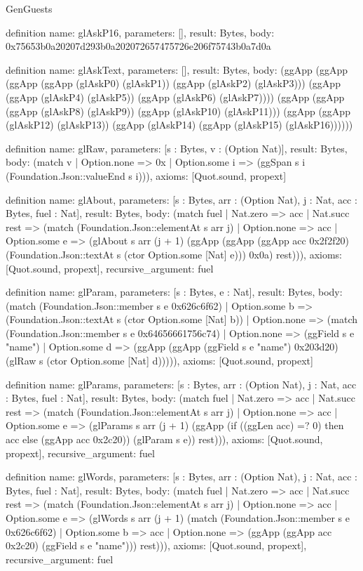 \begin{lexlean}{GenGuests}
\begin{semanticmodule}
definition{
  name: glAskP16,
  parameters: [],
  result: Bytes,
  body: 0x75653b0a20207d293b0a202072657475726e206f75743b0a7d0a
}

definition{
  name: glAskText,
  parameters: [],
  result: Bytes,
  body: (ggApp (ggApp (ggApp (ggApp (glAskP0) (glAskP1)) (ggApp (glAskP2) (glAskP3))) (ggApp (ggApp (glAskP4) (glAskP5)) (ggApp (glAskP6) (glAskP7)))) (ggApp (ggApp (ggApp (glAskP8) (glAskP9)) (ggApp (glAskP10) (glAskP11))) (ggApp (ggApp (glAskP12) (glAskP13)) (ggApp (glAskP14) (ggApp (glAskP15) (glAskP16))))))
}

definition{
  name: glRaw,
  parameters: [s : Bytes, v : (Option Nat)],
  result: Bytes,
  body: (match v
    | Option.none => 0x
    | Option.some i => (ggSpan s i (Foundation.Json::valueEnd s i))),
  axioms: [Quot.sound, propext]
}

definition{
  name: glAbout,
  parameters: [s : Bytes, arr : (Option Nat), j : Nat, acc : Bytes, fuel : Nat],
  result: Bytes,
  body: (match fuel
    | Nat.zero => acc
    | Nat.succ rest => (match (Foundation.Json::elementAt s arr j)
      | Option.none => acc
      | Option.some e => (glAbout s arr (j + 1) (ggApp (ggApp (ggApp acc 0x2f2f20) (Foundation.Json::textAt s (ctor Option.some [Nat] e))) 0x0a) rest))),
  axioms: [Quot.sound, propext],
  recursive_argument: fuel
}

definition{
  name: glParam,
  parameters: [s : Bytes, e : Nat],
  result: Bytes,
  body: (match (Foundation.Json::member s e 0x626c6f62)
    | Option.some b => (Foundation.Json::textAt s (ctor Option.some [Nat] b))
    | Option.none => (match (Foundation.Json::member s e 0x64656661756c74)
      | Option.none => (ggField s e "name")
      | Option.some d => (ggApp (ggApp (ggField s e "name") 0x203d20) (glRaw s (ctor Option.some [Nat] d))))),
  axioms: [Quot.sound, propext]
}

definition{
  name: glParams,
  parameters: [s : Bytes, arr : (Option Nat), j : Nat, acc : Bytes, fuel : Nat],
  result: Bytes,
  body: (match fuel
    | Nat.zero => acc
    | Nat.succ rest => (match (Foundation.Json::elementAt s arr j)
      | Option.none => acc
      | Option.some e => (glParams s arr (j + 1) (ggApp (if ((ggLen acc) =? 0) then acc else (ggApp acc 0x2c20)) (glParam s e)) rest))),
  axioms: [Quot.sound, propext],
  recursive_argument: fuel
}

definition{
  name: glWords,
  parameters: [s : Bytes, arr : (Option Nat), j : Nat, acc : Bytes, fuel : Nat],
  result: Bytes,
  body: (match fuel
    | Nat.zero => acc
    | Nat.succ rest => (match (Foundation.Json::elementAt s arr j)
      | Option.none => acc
      | Option.some e => (glWords s arr (j + 1) (match (Foundation.Json::member s e 0x626c6f62)
        | Option.some b => acc
        | Option.none => (ggApp (ggApp acc 0x2c20) (ggField s e "name"))) rest))),
  axioms: [Quot.sound, propext],
  recursive_argument: fuel
}


\end{semanticmodule}
\end{lexlean}
